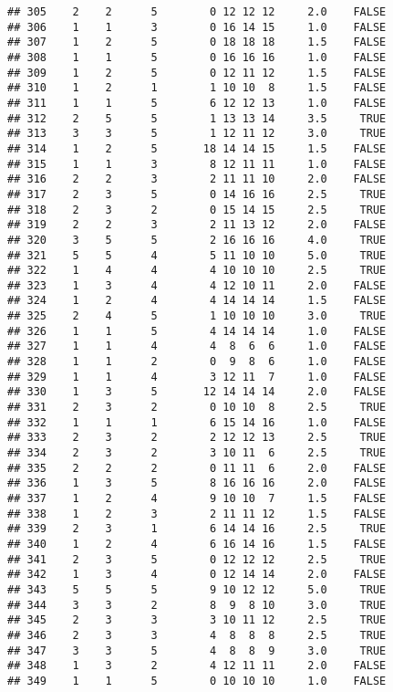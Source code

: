 \documentclass[]{article}
\begin{document}
\begin{verbatim}
## 305    2    2      5        0 12 12 12     2.0    FALSE
## 306    1    1      3        0 16 14 15     1.0    FALSE
## 307    1    2      5        0 18 18 18     1.5    FALSE
## 308    1    1      5        0 16 16 16     1.0    FALSE
## 309    1    2      5        0 12 11 12     1.5    FALSE
## 310    1    2      1        1 10 10  8     1.5    FALSE
## 311    1    1      5        6 12 12 13     1.0    FALSE
## 312    2    5      5        1 13 13 14     3.5     TRUE
## 313    3    3      5        1 12 11 12     3.0     TRUE
## 314    1    2      5       18 14 14 15     1.5    FALSE
## 315    1    1      3        8 12 11 11     1.0    FALSE
## 316    2    2      3        2 11 11 10     2.0    FALSE
## 317    2    3      5        0 14 16 16     2.5     TRUE
## 318    2    3      2        0 15 14 15     2.5     TRUE
## 319    2    2      3        2 11 13 12     2.0    FALSE
## 320    3    5      5        2 16 16 16     4.0     TRUE
## 321    5    5      4        5 11 10 10     5.0     TRUE
## 322    1    4      4        4 10 10 10     2.5     TRUE
## 323    1    3      4        4 12 10 11     2.0    FALSE
## 324    1    2      4        4 14 14 14     1.5    FALSE
## 325    2    4      5        1 10 10 10     3.0     TRUE
## 326    1    1      5        4 14 14 14     1.0    FALSE
## 327    1    1      4        4  8  6  6     1.0    FALSE
## 328    1    1      2        0  9  8  6     1.0    FALSE
## 329    1    1      4        3 12 11  7     1.0    FALSE
## 330    1    3      5       12 14 14 14     2.0    FALSE
## 331    2    3      2        0 10 10  8     2.5     TRUE
## 332    1    1      1        6 15 14 16     1.0    FALSE
## 333    2    3      2        2 12 12 13     2.5     TRUE
## 334    2    3      2        3 10 11  6     2.5     TRUE
## 335    2    2      2        0 11 11  6     2.0    FALSE
## 336    1    3      5        8 16 16 16     2.0    FALSE
## 337    1    2      4        9 10 10  7     1.5    FALSE
## 338    1    2      3        2 11 11 12     1.5    FALSE
## 339    2    3      1        6 14 14 16     2.5     TRUE
## 340    1    2      4        6 16 14 16     1.5    FALSE
## 341    2    3      5        0 12 12 12     2.5     TRUE
## 342    1    3      4        0 12 14 14     2.0    FALSE
## 343    5    5      5        9 10 12 12     5.0     TRUE
## 344    3    3      2        8  9  8 10     3.0     TRUE
## 345    2    3      3        3 10 11 12     2.5     TRUE
## 346    2    3      3        4  8  8  8     2.5     TRUE
## 347    3    3      5        4  8  8  9     3.0     TRUE
## 348    1    3      2        4 12 11 11     2.0    FALSE
## 349    1    1      5        0 10 10 10     1.0    FALSE

\end{verbatim}
\end{document}
